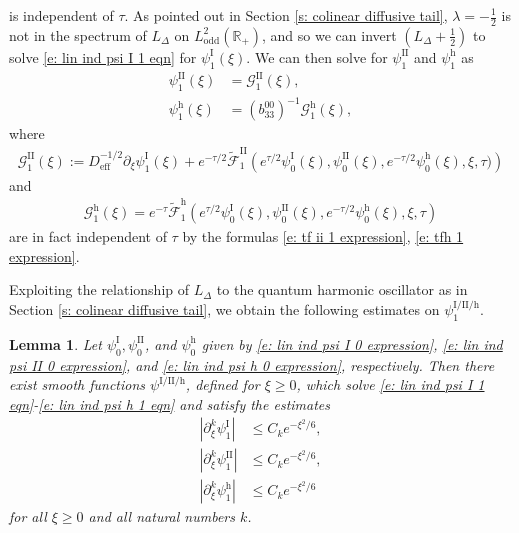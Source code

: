 \documentclass[11pt]{article}
\newcommand{\R}{\mathbb{R}}
\newtheorem{lemma}[prop]{Lemma}
\numberwithin{equation}{section}
\numberwithin{prop}{section}
\newcommand{\psih}{\psi^\mathrm{h}}
\newcommand{\Deff}{D_\mathrm{eff}}
\newcommand{\GII}{\mathcal{G}^\mathrm{II}}
\newcommand{\Gh}{\mathcal{G}^\mathrm{h}}
\newcommand{\tfii}{\tilde{\mathcal{F}}^\mathrm{II}}
\newcommand{\tfh}{\tilde{\mathcal{F}}^\mathrm{h}}
\newcommand{\psiI}{\psi^\mathrm{I}}
\newcommand{\psiII}{\psi^\mathrm{II}}
\begin{document}
is independent of $\tau$. As pointed out in Section \ref{s: colinear diffusive tail}, $\lambda = -\frac{1}{2}$ is not in the spectrum of $L_\Delta$ on $L^2_\mathrm{odd} (\R_+)$, and so we can invert $(L_\Delta + \frac{1}{2})$ to solve \eqref{e: lin ind psi I 1 eqn} for $\psiI_1(\xi)$. We can then solve for $\psiII_1$ and $\psih_1$ as
\begin{align}
\psiII_1 (\xi) &= \GII_1 (\xi), \label{e: lin ind psi I 0 expression}\\
\psih_1 (\xi) &= (b_{33}^{00})^{-1} \Gh_1(\xi), \label{e: lin ind psi h 0 expression}
\end{align}
where 
\begin{align}
\GII_1 (\xi) := \Deff^{-1/2} \partial_\xi \psiI_1 (\xi) + e^{-\tau/2} \tfii_1 \left( e^{\tau/2} \psiI_0 (\xi), \psiII_0 (\xi), e^{-\tau/2} \psih_0 (\xi), \xi, \tau) \right)
\end{align}
and
\begin{align}
\Gh_1(\xi) = e^{-\tau} \tfh_1 \left( e^{\tau/2 }\psiI_0 (\xi), \psiII_0 (\xi),  e^{-\tau/2} \psih_0 (\xi), \xi, \tau \right)
\end{align}
are in fact independent of $\tau$ by the formulas \eqref{e: tf ii 1 expression}, \eqref{e: tfh 1 expression}. 

Exploiting the relationship of $L_\Delta$ to the quantum harmonic oscillator as in Section \ref{s: colinear diffusive tail}, we obtain the following estimates on $\psi^\mathrm{I/II/h}_1$. 

\begin{lemma}\label{l: lin ind psi 1 estimates}
	Let $\psiI_0, \psiII_0$, and $\psih_0$ given by \eqref{e: lin ind psi I 0 expression}, \eqref{e: lin ind psi II 0 expression}, and \eqref{e: lin ind psi h 0 expression}, respectively. Then there exist smooth functions $\psi^{\mathrm{I}/\mathrm{II}/\mathrm{h}}$, defined for $\xi \geq 0$, which solve \eqref{e: lin ind psi I 1 eqn}-\eqref{e: lin ind psi h 1 eqn} and satisfy the estimates
	\begin{align}
	| \partial_\xi^k \psiI_1 | &\leq C_k e^{-\xi^2/6}, \\
	| \partial_\xi^k\psiII_1 | & \leq C_k e^{-\xi^2/6}, \\
	| \partial_\xi^k\psih_1 | &\leq C_k e^{-\xi^2/6}
	\end{align}
	for all $\xi \geq 0$ and all natural numbers $k$. 
\end{lemma}
\end{document}
